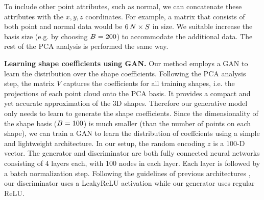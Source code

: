 To include other point attributes, such as normal, we can concatenate these attributes with the $x,y,z$ coordinates. For example, a matrix that consists of both point and normal data would be $6\,N\times S$ in size. We suitable increase the basis size (e.g. by choosing $B=200$) to accommodate the additional data. The rest of the PCA analysis is performed the same way.


\noindent \textbf{Learning shape coefficients using GAN.} Our method employs a GAN to learn the distribution over the shape coefficients. %
Following the PCA analysis step, the matrix $V$ captures the coefficients for all training shapes, i.e. the projections of each point cloud onto the PCA basis. It provides a compact and yet accurate approximation of the 3D shapes. Therefore our generative model only needs to learn to generate the shape coefficients. 
Since the dimensionality of the shape basis ($B=100$) is much smaller (than the number of points on each shape), we can train a GAN to learn the distribution of coeffcients using
a simple and lightweight architecture. In our setup, the random encoding $z$ is a 100-D vector. The generator and discriminator are both fully connected neural networks consisting of 4 layers each, with 100 nodes in each layer.
Each layer is followed by a batch normalization step.
Following the guidelines of previous architectures \cite{wu2016learning}, our discriminator
uses a LeakyReLU activation while our generator uses regular ReLU.



